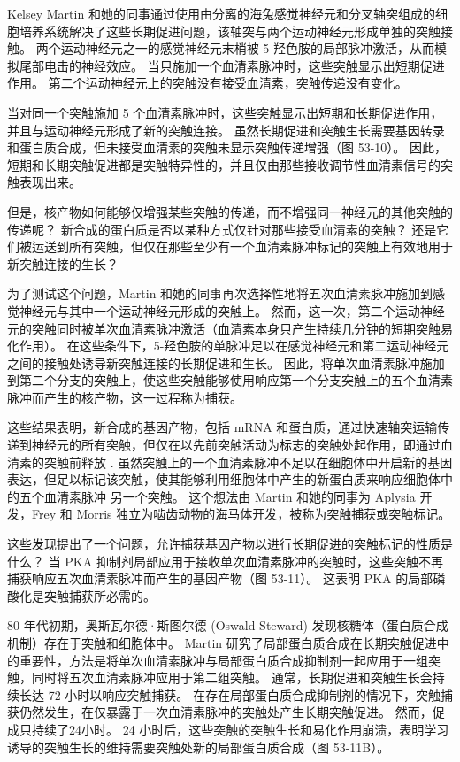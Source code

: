 Kelsey Martin 和她的同事通过使用由分离的海兔感觉神经元和分叉轴突组成的细胞培养系统解决了这些长期促进问题，该轴突与两个运动神经元形成单独的突触接触。 两个运动神经元之一的感觉神经元末梢被 5-羟色胺的局部脉冲激活，从而模拟尾部电击的神经效应。 当只施加一个血清素脉冲时，这些突触显示出短期促进作用。 第二个运动神经元上的突触没有接受血清素，突触传递没有变化。

当对同一个突触施加 5 个血清素脉冲时，这些突触显示出短期和长期促进作用，并且与运动神经元形成了新的突触连接。 虽然长期促进和突触生长需要基因转录和蛋白质合成，但未接受血清素的突触未显示突触传递增强（图 53-10）。 因此，短期和长期突触促进都是突触特异性的，并且仅由那些接收调节性血清素信号的突触表现出来。

但是，核产物如何能够仅增强某些突触的传递，而不增强同一神经元的其他突触的传递呢？ 新合成的蛋白质是否以某种方式仅针对那些接受血清素的突触？ 还是它们被运送到所有突触，但仅在那些至少有一个血清素脉冲标记的突触上有效地用于新突触连接的生长？

为了测试这个问题，Martin 和她的同事再次选择性地将五次血清素脉冲施加到感觉神经元与其中一个运动神经元形成的突触上。 然而，这一次，第二个运动神经元的突触同时被单次血清素脉冲激活（血清素本身只产生持续几分钟的短期突触易化作用）。 在这些条件下，5-羟色胺的单脉冲足以在感觉神经元和第二运动神经元之间的接触处诱导新突触连接的长期促进和生长。 因此，将单次血清素脉冲施加到第二个分支的突触上，使这些突触能够使用响应第一个分支突触上的五个血清素脉冲而产生的核产物，这一过程称为捕获。

这些结果表明，新合成的基因产物，包括 mRNA 和蛋白质，通过快速轴突运输传递到神经元的所有突触，但仅在以先前突触活动为标志的突触处起作用，即通过血清素的突触前释放 . 虽然突触上的一个血清素脉冲不足以在细胞体中开启新的基因表达，但足以标记该突触，使其能够利用细胞体中产生的新蛋白质来响应细胞体中的五个血清素脉冲 另一个突触。 这个想法由 Martin 和她的同事为 Aplysia 开发，Frey 和 Morris 独立为啮齿动物的海马体开发，被称为突触捕获或突触标记。

这些发现提出了一个问题，允许捕获基因产物以进行长期促进的突触标记的性质是什么？ 当 PKA 抑制剂局部应用于接收单次血清素脉冲的突触时，这些突触不再捕获响应五次血清素脉冲而产生的基因产物（图 53-11）。 这表明 PKA 的局部磷酸化是突触捕获所必需的。

80 年代初期，奥斯瓦尔德·斯图尔德 (Oswald Steward) 发现核糖体（蛋白质合成机制）存在于突触和细胞体中。 Martin 研究了局部蛋白质合成在长期突触促进中的重要性，方法是将单次血清素脉冲与局部蛋白质合成抑制剂一起应用于一组突触，同时将五次血清素脉冲应用于第二组突触。 通常，长期促进和突触生长会持续长达 72 小时以响应突触捕获。 在存在局部蛋白质合成抑制剂的情况下，突触捕获仍然发生，在仅暴露于一次血清素脉冲的突触处产生长期突触促进。 然而，促成只持续了24小时。 24 小时后，这些突触的突触生长和易化作用崩溃，表明学习诱导的突触生长的维持需要突触处新的局部蛋白质合成（图 53-11B）。

